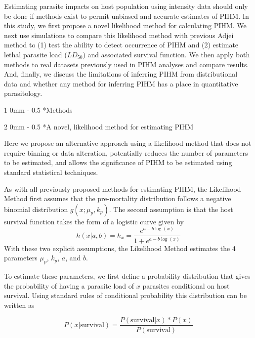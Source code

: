 \documentclass[12pt, a4paper]{article}
\makeatletter
\renewcommand{\section}{\@startsection
{section}%
{1}%
{0mm}%
{-\baselineskip}%
{0.5\baselineskip}%
{\normalfont\bf\large}} %
\renewcommand{\subsection}{\@startsection
{subsection}%
{2}%
{0mm}%
{-\baselineskip}%
{0.5\baselineskip}%
{\normalfont\bf}} %
\makeatother
\begin{document}
Estimating parasite impacts on host population using intensity data should only
be done if methods exist to permit unbiased and accurate estimates of PIHM. In
this study, we first propose a novel likelihood method for calculating PIHM. We
next use simulations to compare this likelihood method with previous Adjei
method to (1) test the ability to detect occurrence of PIHM and (2) estimate
lethal parasite load ($LD_{50}$) and associated survival function.  We then
apply both methods to real datasets previously used in PIHM analyses and
compare results. And, finally, we discuss the limitations of inferring PIHM
from distributional data and whether any method for inferring PIHM has a place
in quantitative parasitology.

\section*{Methods}

\subsection*{A novel, likelihood method for estimating PIHM}

Here we propose an alternative approach using a likelihood method that does not
require binning or data alteration, potentially reduces the number of
parameters to be estimated, and allows the significance of PIHM to be estimated
using standard statistical techniques.

As with all previously proposed methods for estimating PIHM, the
Likelihood Method first assumes that the pre-mortality distribution follows a
negative binomial distribution $g(x; \mu_p, k_p)$.  The second
assumption is that the host survival function
takes the form of a logistic curve given by
\begin{equation}
    h(x | a, b) = h_x = \dfrac{e^{a - b \log(x)}}{1 + e^{a - b \log(x)}}
    \label{eq:logistic}
\end{equation}
With these two explicit assumptions, the Likelihood Method estimates the 4 parameters $\mu_p$, $k_p$, $a$, and $b$.

To estimate these parameters, we first define a probability distribution that gives the probability of having a parasite load of $x$ parasites conditional on host survival.  Using standard rules of conditional probability this distribution can be written as

\begin{equation}
    P(x | \text{survival}) = \dfrac{P(\text{survival} | x) * P(x)}{P(\text{survival})}
    \label{eq:concept}
\end{equation}
\end{document}
